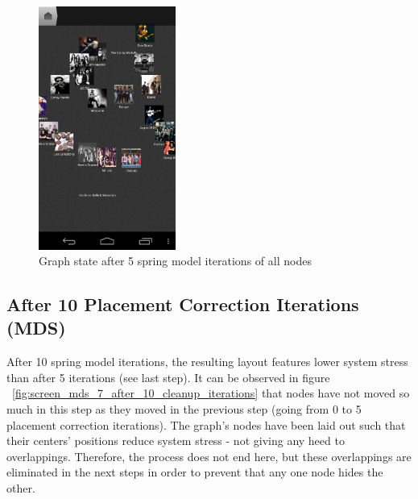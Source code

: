 \begin{figure}[H]
  \centering
    \includegraphics[width=0.4\textwidth]{figures/screen_mds_6_after_5_cleanup_iterations}
  \caption{Graph state after 5 spring model iterations of all nodes}
  \label{fig:screen_mds_6_after_5_cleanup_iterations}
\end{figure}

\newpage
\subsection{After 10 Placement Correction Iterations (MDS)}
\label{subsec:mds-after-ten-placement-iterations}

After 10 spring model iterations, the resulting layout features lower system stress than after 5 iterations (see last step). It can be observed in figure ~\ref{fig:screen_mds_7_after_10_cleanup_iterations} that nodes have not moved so much in this step as they moved in the previous step (going from 0 to 5 placement correction iterations).
The graph's nodes have been laid out such that their centers' positions reduce system stress - not giving any heed to overlappings. Therefore, the process does not end here, but these overlappings are eliminated in the next steps in order to prevent that any one node hides the other.

